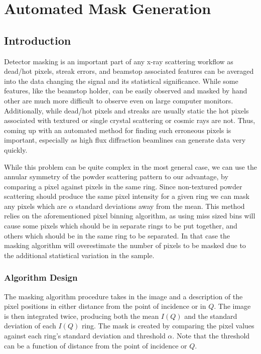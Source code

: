 \section{Automated Mask Generation} \label{subsec:mask}
\subsection{Introduction}
Detector masking is an important part of any x-ray scattering workflow as dead/hot pixels, streak errors, and beamstop associated features can be averaged into the data changing the signal and its statistical significance.
While some features, like the beamstop holder, can be easily observed and masked by hand other are much more difficult to observe even on large computer monitors.
Additionally, while dead/hot pixels and streaks are usually static the hot pixels associated with textured or single crystal scattering or cosmic rays are not.
Thus, coming up with an automated method for finding such erroneous pixels is important, especially as high flux diffraction beamlines can generate data very quickly.

While this problem can be quite complex in the most general case, we can use the annular symmetry of the powder scattering pattern to our advantage, by comparing a pixel against pixels in the same ring.
Since non-textured powder scattering should produce the same pixel intensity for a given ring we can mask any pixels which are $\alpha$ standard deviations away from the mean.
This method relies on the aforementioned pixel binning algorithm, as using miss sized bins will cause some pixels which should be in separate rings to be put together, and others which should be in the same ring to be separated.
In that case the masking algorithm will overestimate the number of pixels to be masked due to the additional statistical variation in the sample.

\subsubsection{Algorithm Design}
The masking algorithm procedure takes in the image and a description of the pixel positions in either distance from the point of incidence or in $Q$.
The image is then integrated twice, producing both the mean $I(Q)$ and the standard deviation of each $I(Q)$ ring.
The mask is created by comparing the pixel values against each ring's standard deviation and threshold $\alpha$.
Note that the threshold can be a function of distance from the point of incidence or $Q$.

